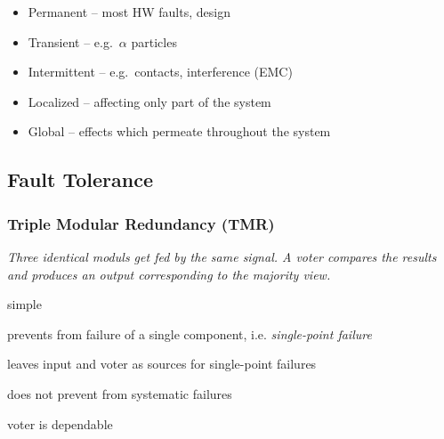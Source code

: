\documentclass[
  10pt,
  a4paper,
  twocolumn]{article}
\providecommand{\tightlist}{%
  \setlength{\itemsep}{0pt}\setlength{\parskip}{0pt}}\usepackage{longtable,booktabs,array}
\DeclareRobustCommand{\textHighlight}[1]{\tikz[baseline]{\node[anchor=base,fill=Gray!10, rounded corners=5pt, draw, densely dotted] {\bfseries{#1}};}}
\begin{document}
\textHighlight{\bfseries D{\fontsize{7pt}{8pt}\selectfont{URATION}}}

\begin{itemize}
\tightlist
\item
  Permanent -- most HW faults, design
\item
  Transient -- e.g.~\(\alpha\) particles
\item
  Intermittent -- e.g.~contacts, interference (EMC)
\end{itemize}

\textHighlight{\bfseries E{\fontsize{7pt}{8pt}\selectfont{XTEND}}}

\begin{itemize}
\tightlist
\item
  Localized -- affecting only part of the system
\item
  Global -- effects which permeate throughout the system
\end{itemize}

\subsection{Fault Tolerance}\label{fault-tolerance}

\subsubsection{Triple Modular Redundancy
(TMR)}\label{triple-modular-redundancy-tmr}

{\small\textit{Three identical moduls get fed by the same signal. A voter compares the results and produces an output corresponding to the majority view.}}

\begin{center}

\end{center}

{\small\begin{description}[parsep=0mm,labelsep=2pt,labelwidth=10pt]
  \item[\color{OliveGreen}\faPlus] simple
  \item[\color{OliveGreen}\faPlus] prevents from failure of a single component, i.e. \textit{single-point failure}
  \item[\color{BrickRed}\faMinus] leaves input and voter as sources for single-point failures
  \item[\color{BrickRed}\faMinus] does not prevent from systematic failures
  \item[\color{BrickRed}\faMinus] voter is dependable
\end{description}}
\end{document}
